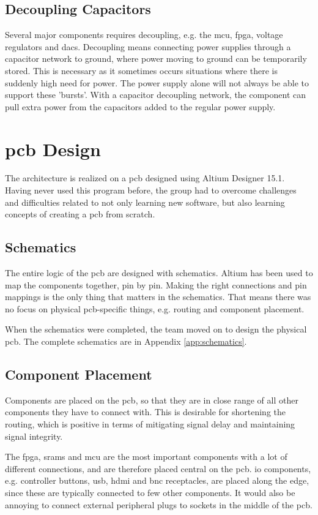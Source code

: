 \subsection{Decoupling Capacitors}
Several major components requires decoupling, e.g. the \gls{mcu}, \gls{fpga}, voltage regulators and \gls{dac}s.
Decoupling means connecting power supplies through a capacitor network to ground, where power moving to ground can be temporarily stored.
This is necessary as it sometimes occurs situations where there is suddenly high need for power.
The power supply alone will not always be able to support these 'bursts'.
With a capacitor decoupling network, the component can pull extra power from the capacitors added to the regular power supply.

\section{\gls{pcb} Design}
The architecture is realized on a \gls{pcb} designed using Altium Designer 15.1.
Having never used this program before, the group had to overcome challenges and difficulties related to not only learning new software, but also learning concepts of creating a \gls{pcb} from scratch.

\subsection{Schematics}
The entire logic of the \gls{pcb} are designed with schematics.
Altium has been used to map the components together, pin by pin.
Making the right connections and pin mappings is the only thing that matters in the schematics.
That means there was no focus on physical \gls{pcb}-specific things, e.g. routing and component placement.

When the schematics were completed, the team moved on to design the physical \gls{pcb}.
The complete schematics are in Appendix \ref{app:schematics}.

\subsection{Component Placement}
Components are placed on the \gls{pcb}, so that they are in close range of all other components they have to connect with.
This is desirable for shortening the routing, which is positive in terms of mitigating signal delay and maintaining signal integrity.

The \gls{fpga}, \gls{sram}s and \gls{mcu} are the most important components with a lot of different connections, and are therefore placed central on the \gls{pcb}.
\gls{io} components, e.g. controller buttons, \gls{usb}, \gls{hdmi} and \gls{bnc} receptacles, are placed along the edge, since these are typically connected to few other components.
It would also be annoying to connect external peripheral plugs to sockets in the middle of the \gls{pcb}.

